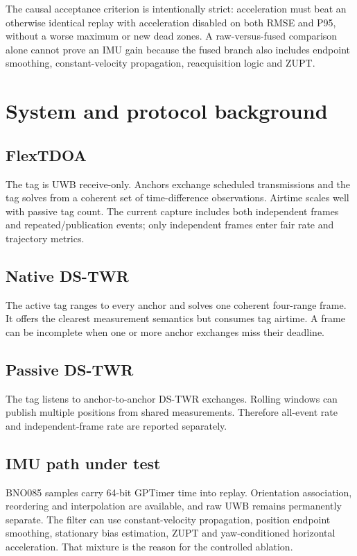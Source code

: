 \documentclass[10pt,a4paper]{article}
\begin{document}
The causal acceptance criterion is intentionally strict: acceleration must
beat an otherwise identical replay with acceleration disabled on both RMSE and
P95, without a worse maximum or new dead zones. A raw-versus-fused comparison
alone cannot prove an IMU gain because the fused branch also includes endpoint
smoothing, constant-velocity propagation, reacquisition logic and ZUPT.

\section{System and protocol background}

\subsection{FlexTDOA}
The tag is UWB receive-only. Anchors exchange scheduled transmissions and the
tag solves from a coherent set of time-difference observations. Airtime scales
well with passive tag count. The current capture includes both independent
frames and repeated/publication events; only independent frames enter fair
rate and trajectory metrics.

\subsection{Native DS-TWR}
The active tag ranges to every anchor and solves one coherent four-range frame.
It offers the clearest measurement semantics but consumes tag airtime. A frame
can be incomplete when one or more anchor exchanges miss their deadline.

\subsection{Passive DS-TWR}
The tag listens to anchor-to-anchor DS-TWR exchanges. Rolling windows can
publish multiple positions from shared measurements. Therefore all-event rate
and independent-frame rate are reported separately.

\subsection{IMU path under test}
BNO085 samples carry 64-bit GPTimer time into replay. Orientation association,
reordering and interpolation are available, and raw UWB remains permanently
separate. The filter can use constant-velocity propagation, position endpoint
smoothing, stationary bias estimation, ZUPT and yaw-conditioned horizontal
acceleration. That mixture is the reason for the controlled ablation.
\end{document}
